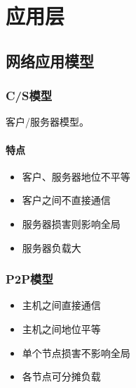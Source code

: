 
\chapter{应用层}

\section{网络应用模型}

\subsection{C/S模型}
客户/服务器模型。

\subsubsection{特点}
\begin{itemize}
    \item 客户、服务器地位不平等
    \item 客户之间不直接通信
    \item 服务器损害则影响全局
    \item 服务器负载大
\end{itemize}


\subsection{P2P模型}
\begin{itemize}
    \item 主机之间直接通信
    \item 主机之间地位平等
    \item 单个节点损害不影响全局
    \item 各节点可分摊负载
\end{itemize}




